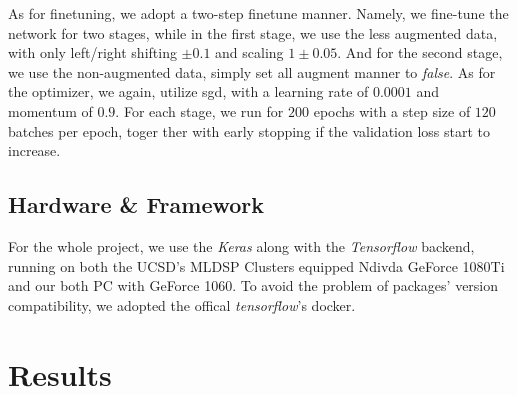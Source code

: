 \documentclass{article}
\begin{document}
As for finetuning, we adopt a two-step finetune manner. 
Namely, we fine-tune the network for two stages, while in the first stage, we use the less augmented data, with only left/right shifting $\pm 0.1$ and scaling $1\pm0.05$. 
And for the second stage, we use the non-augmented data, simply set all augment manner to \emph{false}. 
As for the optimizer, we again, utilize sgd, with a learning rate of $0.0001$ and momentum of $0.9$. 
For each stage, we run for $200$ epochs with a step size of $120$ batches per epoch, toger ther with early stopping if the validation loss start to increase. 

\subsection{Hardware \& Framework}
For the whole project, we use the \emph{Keras} along with the \emph{Tensorflow} backend, running on both the UCSD's MLDSP Clusters equipped Ndivda GeForce 1080Ti and our both PC with GeForce 1060. 
To avoid the problem of packages' version compatibility, we adopted the offical \emph{tensorflow}'s docker. 

\section{Results}
\end{document}
